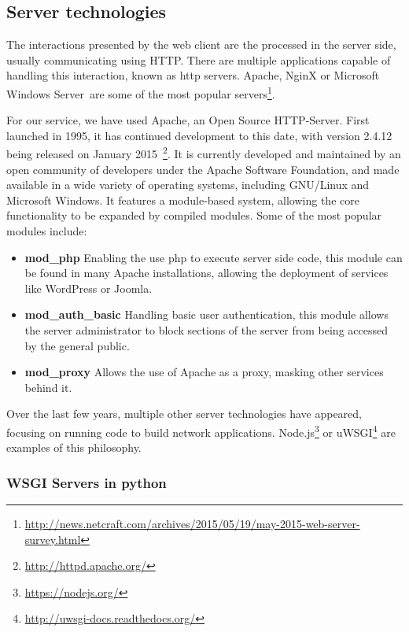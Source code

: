 
\subsection{Server technologies}


The interactions presented by the web client are the processed in the server side, usually communicating using HTTP. There are multiple applications capable of handling this interaction, known as http servers. Apache, NginX or Microsoft Windows Server\textregistered~are some of the most popular servers\footnote{\url{http://news.netcraft.com/archives/2015/05/19/may-2015-web-server-survey.html}}. 

For our service, we have used Apache\cite{apacheabout}, an Open Source HTTP-Server. First launched in 1995, it has continued development to this date, with version 2.4.12 being released on January 2015~\footnote{\url{http://httpd.apache.org/}}. It is currently developed and maintained by an open community of developers under the Apache Software Foundation, and made available in a wide variety of operating systems, including GNU/Linux and Microsoft Windows\textregistered. It features a module-based system, allowing the core functionality to be expanded by compiled modules. Some of the most popular modules include:

\begin{itemize}[topsep=0pt,itemsep=-1ex,partopsep=1ex,parsep=1ex]
 \item \textbf{mod\_php} Enabling the use php to execute server side code, this module can be found in many Apache installations, allowing the deployment of services like WordPress or Joomla.
 \item \textbf{mod\_auth\_basic} Handling basic user authentication, this module allows the server administrator to block sections of the server from being accessed by the general public.
 \item \textbf{mod\_proxy} Allows the use of Apache as a proxy, masking other services behind it.
\end{itemize}

Over the last few years, multiple other server technologies have appeared, focusing on running code to build network applications. Node.js\footnote{\url{https://nodejs.org/}} or uWSGI\footnote{\url{http://uwsgi-docs.readthedocs.org/}} are examples of this philosophy.

\subsubsection{WSGI Servers in python}

